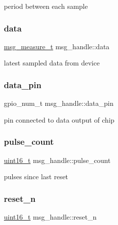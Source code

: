 period between each sample \mbox{\label{structmsg__handle_ab8254aa210bf3218eb7c5aeae4751a76}} 
\subsubsection{\texorpdfstring{data}{data}}
{\footnotesize\ttfamily \hyperlink{structMSGEQ7__Measures}{msg\+\_\+measure\+\_\+t} msg\+\_\+handle\+::data}

latest sampled data from device \mbox{\label{structmsg__handle_a6ecce9c5946c5ea3abf2f6a03a3a56d4}} 
\subsubsection{\texorpdfstring{data\+\_\+pin}{data\_pin}}
{\footnotesize\ttfamily gpio\+\_\+num\+\_\+t msg\+\_\+handle\+::data\+\_\+pin}

pin connected to data output of chip \mbox{\label{structmsg__handle_aa5ad7cd77c31f44c49a979bfda5a65ba}} 
\subsubsection{\texorpdfstring{pulse\+\_\+count}{pulse\_count}}
{\footnotesize\ttfamily \hyperlink{vl53l0x__types_8h_a273cf69d639a59973b6019625df33e30}{uint16\+\_\+t} msg\+\_\+handle\+::pulse\+\_\+count}

pulses since last reset \mbox{\label{structmsg__handle_aa813acda542b8df85aff47b8c481b636}} 
\subsubsection{\texorpdfstring{reset\+\_\+n}{reset\_n}}
{\footnotesize\ttfamily \hyperlink{vl53l0x__types_8h_a273cf69d639a59973b6019625df33e30}{uint16\+\_\+t} msg\+\_\+handle\+::reset\+\_\+n}

